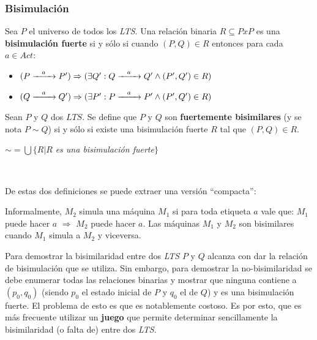 \documentclass[]{article}
\begin{document}
\subsubsection{Bisimulación}
Sea $P$ el universo de todos los \textit{LTS}. Una relación binaria $R\subseteq PxP$ es una \textbf{bisimulación fuerte} si y sólo si cuando $(P,Q)\in R$ entonces para cada $a\in Act$:
\begin{itemize}
	\item $(P\xrightarrow{\hspace*{0.3cm} a \hspace*{0.3cm}}P')\Rightarrow (\exists Q' : Q\xrightarrow{\hspace*{0.3cm} a \hspace*{0.3cm}}Q' \wedge (P',Q')\in R)$
	\item $(Q\xrightarrow{\hspace*{0.3cm} a \hspace*{0.3cm}}Q')\Rightarrow (\exists P' : P\xrightarrow{\hspace*{0.3cm} a \hspace*{0.3cm}}P' \wedge (P',Q')\in R)$
\end{itemize}

Sean $P$ y $Q$ dos $LTS$. Se define que $P$ y $Q$ son \textbf{fuertemente bisimilares} (y se nota $P \sim Q$) si y sólo si existe una bisimulación fuerte $R$ tal que $(P,Q)\in R$.
\begin{center}
	$\sim =\bigcup\{R|R$\textit{ es una bisimulación fuerte}$\}$
\end{center}

~\newline

De estas dos definiciones se puede extraer una versión ``compacta'':


Informalmente, $M_2$ simula una máquina $M_1$ si para toda etiqueta $a$ vale que: $M_1$ puede hacer $a$ $\Rightarrow$ $M_2$ puede hacer $a$. Las máquinas $M_1$ y $M_2$ son bisimilares cuando $M_1$ simula a $M_2$ y viceversa.


Para demostrar la bisimilaridad entre dos \textit{LTS} $P$ y $Q$ alcanza con dar la relación de bisimulación que se utiliza. Sin embargo, para demostrar la no-bisimilaridad se debe enumerar todas las relaciones binarias y mostrar que ninguna contiene a $(p_0,q_0)$ (siendo $p_0$ el estado inicial de $P$ y $q_0$ el de $Q$) y es una bisimulación fuerte. El problema de esto es que es notablemente costoso. Es por esto, que es más frecuente utilizar un \textbf{juego} que permite determinar sencillamente la bisimilaridad (o falta de) entre dos \textit{LTS}.
\end{document}
